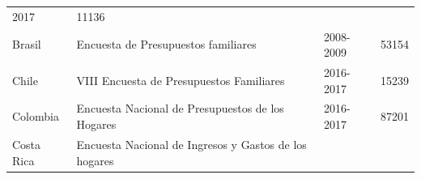 \begin{longtable}[]{@{}llll@{}}
\begin{minipage}[t]{0.08\columnwidth}
2017\strut
\end{minipage} & \begin{minipage}[t]{0.14\columnwidth}\raggedright
11136\strut
\end{minipage}\tabularnewline
\begin{minipage}[t]{0.17\columnwidth}\raggedright
Brasil\strut
\end{minipage} & \begin{minipage}[t]{0.50\columnwidth}\raggedright
Encuesta de Presupuestos familiares\strut
\end{minipage} & \begin{minipage}[t]{0.08\columnwidth}\raggedright
2008-2009\strut
\end{minipage} & \begin{minipage}[t]{0.14\columnwidth}\raggedright
53154\strut
\end{minipage}\tabularnewline
\begin{minipage}[t]{0.17\columnwidth}\raggedright
Chile\strut
\end{minipage} & \begin{minipage}[t]{0.50\columnwidth}\raggedright
VIII Encuesta de Presupuestos Familiares\strut
\end{minipage} & \begin{minipage}[t]{0.08\columnwidth}\raggedright
2016-2017\strut
\end{minipage} & \begin{minipage}[t]{0.14\columnwidth}\raggedright
15239\strut
\end{minipage}\tabularnewline
\begin{minipage}[t]{0.17\columnwidth}\raggedright
Colombia\strut
\end{minipage} & \begin{minipage}[t]{0.50\columnwidth}\raggedright
Encuesta Nacional de Presupuestos de los Hogares\strut
\end{minipage} & \begin{minipage}[t]{0.08\columnwidth}\raggedright
2016-2017\strut
\end{minipage} & \begin{minipage}[t]{0.14\columnwidth}\raggedright
87201\strut
\end{minipage}\tabularnewline
\begin{minipage}[t]{0.17\columnwidth}\raggedright
Costa Rica\strut
\end{minipage} & \begin{minipage}[t]{0.50\columnwidth}\raggedright
Encuesta Nacional de Ingresos y Gastos de los hogares\strut

\end{minipage}
\end{longtable}

